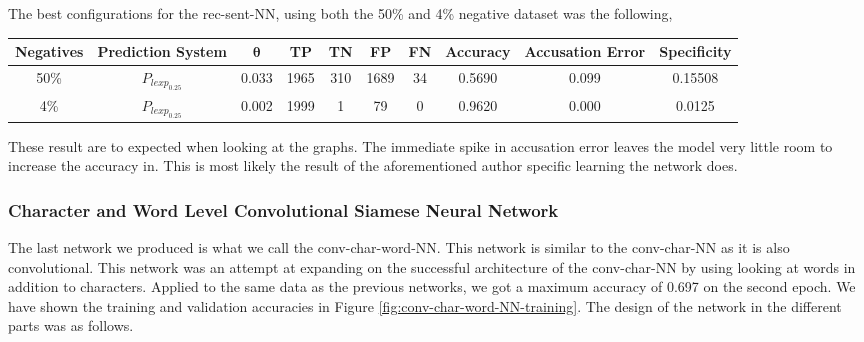 The best configurations for the \gls{rec-sent-NN}, using both the 50\% and 4\%
negative dataset was the following,

\begin{center}
    \begin{adjustbox}{center}
    \scriptsize
    \begin{tabular}{|c|c|c|c|c|c|c|c|c|c|}
        \hline
        \textbf{Negatives} & \textbf{Prediction System} & $\mathbf{\theta}$ & \textbf{TP} & \textbf{TN} & \textbf{FP} & \textbf{FN} &
        \textbf{Accuracy} & \textbf{Accusation Error} & \textbf{Specificity}
        \\ \hline
        50\%      & $P_{lexp_{0.25}}$ & 0.033    & 1965 & 310 & 1689 & 34  &
        0.5690    & 0.099 & 0.15508
        \\ \hline
        4\%       & $P_{lexp_{0.25}}$ & 0.002    & 1999 & 1   & 79   & 0   &
        0.9620    & 0.000 & 0.0125
        \\ \hline
    \hline
    \end{tabular}
    \end{adjustbox}
\end{center}

These result are to expected when looking at the graphs. The immediate spike in
accusation error leaves the model very little room to increase the accuracy in.
This is most likely the result of the aforementioned author specific learning
the network does.


\subsubsection{Character and Word Level Convolutional Siamese Neural Network}
\label{subsubsec:conv_char_word_nn}

The last network we produced is what we call the \gls{conv-char-word-NN}. This
network is similar to the \gls{conv-char-NN} as it is also convolutional. This
network was an attempt at expanding on the successful architecture of the
\gls{conv-char-NN} by using looking at words in addition to characters. Applied
to the same data as the previous networks, we got a maximum accuracy of 0.697 on
the second epoch. We have shown the training and validation accuracies in Figure
\ref{fig:conv-char-word-NN-training}. The design of the network in the different
parts was as follows.

